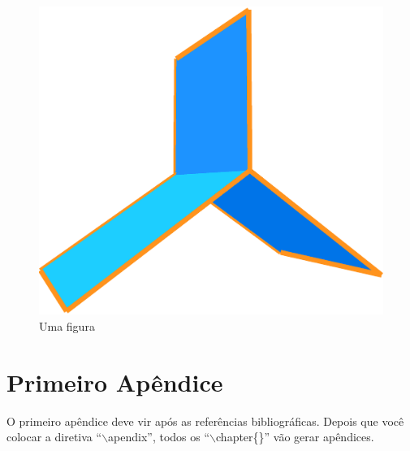 \documentclass[dissertacao,brazil]{ThesisPUC}
\begin{document}
\begin{figure}
  \includegraphics*[width=\linewidth]{ctor4_none.eps}
  \caption{Uma figura}
\end{figure}

\arial


\normalfont
%

\appendix

\chapter{Primeiro Apêndice}
O primeiro apêndice deve vir após as referências bibliográficas. Depois que você colocar a diretiva ``{$\backslash$}apendix'', todos os ``{$\backslash$}chapter\{\}'' vão gerar apêndices.
\end{document}
